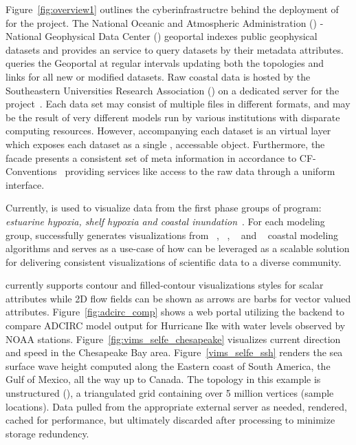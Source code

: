 Figure~\ref{fig:overview1} outlines the cyberinfrastructre behind the
deployment of \sciwms{} for the \comt{} project. The National Oceanic
and Atmospheric Administration (\noaa{}) - National Geophysical Data
Center (\ngdc{}) geoportal indexes public geophysical datasets and
provides an \ogc{} \csw{} service to query datasets by their metadata
attributes. \sciwms{} queries the \ngdc{} Geoportal at regular
intervals updating both the topologies and
\opendap{}~\cite{Cornillon03} links for all new or modified datasets.
Raw coastal data is hosted by the Southeastern Universities Research
Association (\sura{}) on a dedicated server for the \comt{}
project~\cite{luettich12}. Each data set may consist of multiple files
in different formats, and may be the result of very different models
run by various institutions with disparate computing
resources. However, accompanying each dataset is an \ncml{} virtual
layer which exposes each dataset as a single \netcdf{}, \opendap{}
accessable object. Furthermore, the \ncml{} facade presents a
consistent set of meta information in accordance to
CF-Conventions~\cite{cf} providing services like \sciwms{} access to
the raw data through a uniform interface.

Currently, \Sciwms{} is used to visualize data from the first phase
groups of \ioos{} \comt{} program: {\em estuarine hypoxia, shelf
  hypoxia and coastal inundation}~\cite{luettich13}. For each modeling
group, \sciwms{} successfully generates visualizations from
\adcirc{}~\cite{adcirc}, \fvcom{}~\cite{chen06},
\selfe{}~\cite{zhang08} and \slosh{}~\cite{chen84} coastal modeling
algorithms and serves as a use-case of how \sciwms{} can be leveraged
as a scalable solution for delivering consistent visualizations of
scientific data to a diverse community. 

\sciwms{} currently supports contour and filled-contour visualizations
styles for scalar attributes while 2D flow fields can be shown as
arrows are barbs for vector valued
attributes. Figure~\ref{fig:adcirc_comp} shows a web portal utilizing
the \sciwms{} backend to compare ADCIRC model output for Hurricane Ike
with water levels observed by NOAA
stations. Figure~\ref{fig:vims_selfe_chesapeake} visualizes current
direction and speed in the Chesapeake Bay
area. Figure~\ref{vims_selfe_ssh} renders the sea surface wave height
computed along the Eastern coast of South America, the Gulf of Mexico,
all the way up to Canada. The topology in this example is unstructured
(\ugrid{}), a triangulated grid containing over 5 million vertices
(sample locations). Data pulled from the appropriate external server
as needed, rendered, cached for performance, but ultimately discarded
after processing to minimize storage redundency.

